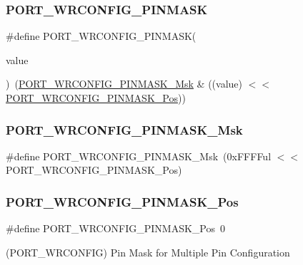\subsubsection{\texorpdfstring{PORT\_WRCONFIG\_PINMASK}{PORT\_WRCONFIG\_PINMASK}}
{\footnotesize\ttfamily \#define P\+O\+R\+T\+\_\+\+W\+R\+C\+O\+N\+F\+I\+G\+\_\+\+P\+I\+N\+M\+A\+SK(\begin{DoxyParamCaption}\item[{}]{value }\end{DoxyParamCaption})~(\mbox{\hyperlink{group___s_a_m_d21___p_o_r_t_ga55c432605b18507992b4540265c1768a}{P\+O\+R\+T\+\_\+\+W\+R\+C\+O\+N\+F\+I\+G\+\_\+\+P\+I\+N\+M\+A\+S\+K\+\_\+\+Msk}} \& ((value) $<$$<$ \mbox{\hyperlink{group___s_a_m_d21___p_o_r_t_gab1a78a8f36fb7fceed5ec4b2f821670e}{P\+O\+R\+T\+\_\+\+W\+R\+C\+O\+N\+F\+I\+G\+\_\+\+P\+I\+N\+M\+A\+S\+K\+\_\+\+Pos}}))}

\mbox{\label{group___s_a_m_d21___p_o_r_t_ga55c432605b18507992b4540265c1768a}} 
\subsubsection{\texorpdfstring{PORT\_WRCONFIG\_PINMASK\_Msk}{PORT\_WRCONFIG\_PINMASK\_Msk}}
{\footnotesize\ttfamily \#define P\+O\+R\+T\+\_\+\+W\+R\+C\+O\+N\+F\+I\+G\+\_\+\+P\+I\+N\+M\+A\+S\+K\+\_\+\+Msk~(0x\+F\+F\+F\+Ful $<$$<$ P\+O\+R\+T\+\_\+\+W\+R\+C\+O\+N\+F\+I\+G\+\_\+\+P\+I\+N\+M\+A\+S\+K\+\_\+\+Pos)}

\mbox{\label{group___s_a_m_d21___p_o_r_t_gab1a78a8f36fb7fceed5ec4b2f821670e}} 
\subsubsection{\texorpdfstring{PORT\_WRCONFIG\_PINMASK\_Pos}{PORT\_WRCONFIG\_PINMASK\_Pos}}
{\footnotesize\ttfamily \#define P\+O\+R\+T\+\_\+\+W\+R\+C\+O\+N\+F\+I\+G\+\_\+\+P\+I\+N\+M\+A\+S\+K\+\_\+\+Pos~0}



(P\+O\+R\+T\+\_\+\+W\+R\+C\+O\+N\+F\+IG) Pin Mask for Multiple Pin Configuration 

